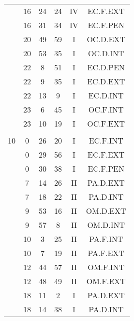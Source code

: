 \documentclass[12pt, a4paper]{article}
\begin{document}
\begin{multicols}{3}
{\begin{tabular}{c c c c c c}
	 	 	 	 & 16 & 24 & 24 & IV & EC.F.EXT\\%
	 	 	 	 & 16 & 31 & 34 & IV & EC.F.PEN\\%
	 	 	 	 & 20 & 49 & 59 & I & OC.D.EXT\\%
	 	 	 	 & 20 & 53 & 35 & I & OC.D.INT\\%
	 	 	 	 & 22 & 8 & 51 & I & EC.D.PEN\\%
	 	 	 	 & 22 & 9 & 35 & I & EC.D.EXT\\%
	 	 	 	 & 22 & 13 & 9 & I & EC.D.INT\\%
	 	 	 	 & 23 & 6 & 45 & I & OC.F.INT\\%
	 	 	 	 & 23 & 10 & 19 & I & OC.F.EXT\\%
	 	 	 	 & & & & & \\%
	 	 	 	10 & 0 & 26 & 20 & I & EC.F.INT\\%
	 	 	 	 & 0 & 29 & 56 & I & EC.F.EXT\\%
	 	 	 	 & 0 & 30 & 38 & I & EC.F.PEN\\%
	 	 	 	 & 7 & 14 & 26 & II & PA.D.EXT\\%
	 	 	 	 & 7 & 18 & 22 & II & PA.D.INT\\%
	 	 	 	 & 9 & 53 & 16 & II & OM.D.EXT\\%
	 	 	 	 & 9 & 57 & 8 & II & OM.D.INT\\%
	 	 	 	 & 10 & 3 & 25 & II & PA.F.INT\\%
	 	 	 	 & 10 & 7 & 19 & II & PA.F.EXT\\%
	 	 	 	 & 12 & 44 & 57 & II & OM.F.INT\\%
	 	 	 	 & 12 & 48 & 49 & II & OM.F.EXT\\%
	 	 	 	 & 18 & 11 & 2 & I & PA.D.EXT\\%
	 	 	 	 & 18 & 14 & 38 & I & PA.D.INT\\%

\end{tabular}}
\end{multicols}
\end{document}
